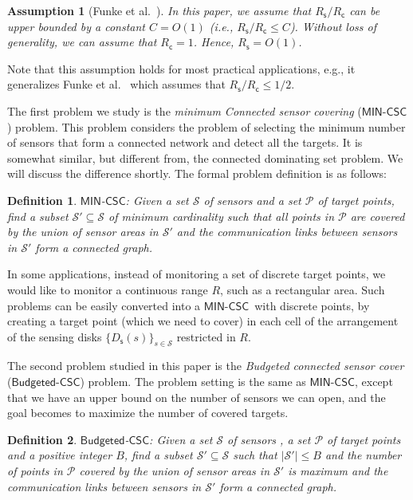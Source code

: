 \documentclass[11pt]{article}
\newcommand{\calP}{{\mathcal P}}
\newcommand{\calS}{{\mathcal S}}
\newtheorem{assumption}{Assumption}
\newcommand{\mincsc}{$\mathsf{MIN}$-$\mathsf{CSC}$}
\newcommand{\bcsc}{$\mathsf{Budgeted}$-$\mathsf{CSC}$}
\newcommand{\Rc}{R_\mathsf{c}}
\newcommand{\Rs}{R_\mathsf{s}}
\newcommand{\Ds}{D_\mathsf{s}}
\newtheorem{definition}{Definition}
\begin{document}
\begin{assumption}[Funke et al.~\cite{funke2007improved}]
	\label{ass:1}
	In this paper, we assume that $\Rs/\Rc$ can be upper bounded by a constant $C=O(1)$
	(i.e., $\Rs/\Rc\leq C$). 
Without loss of generality, we can assume that $\Rc=1$.
	Hence, $\Rs= O(1)$.
\end{assumption}

Note that this assumption holds for most practical
applications, e.g., it generalizes Funke et al.~\cite{funke2007improved} which assumes that $\Rs/\Rc\leq 1/2$.

The first problem we study is the {\em minimum Connected sensor covering} (\mincsc) problem.
This problem considers the problem of selecting the minimum number of sensors
that form a connected network and detect all the targets.
It is somewhat similar, but different from, the connected dominating set problem.
We will discuss the difference shortly.
The formal problem definition is as follows:

\begin{definition}
	\mincsc: Given a set $\calS$ of sensors
	and a set $\calP$ of target points,
	find a subset $\calS'\subseteq \calS$ of minimum cardinality
	such that all points in $\calP$ are covered by the union of sensor areas in $\calS'$
	and the communication links between sensors in $\calS'$ form a connected graph.
\end{definition}
\vspace{-0.1cm}

In some applications, instead of monitoring a set of discrete target points,
we would like to monitor a continuous range $R$, such as a rectangular area.
Such problems can be easily converted into a \mincsc\ with discrete points,
by creating a target point (which we need to cover) in each cell of the arrangement
of the sensing disks $\{\Ds(s)\}_{s\in \calS}$ restricted in $R$.


The second problem
studied in this paper is the {\em Budgeted connected sensor cover}  (\bcsc) problem.
The problem setting is the same as \mincsc, except that
we have an upper bound on the number of sensors we can open, and the goal becomes
to maximize the number of covered targets.

\vspace{-0.1cm}
\begin{definition}
	\bcsc: Given a set $\calS$ of sensors , a set $\calP$ of target points and a positive integer $B$,
	find a subset $\calS'\subseteq \calS$
	such that $|\calS'| \leq B$ and the number of points in $\calP$ covered by the union of sensor areas in $\calS'$ is maximum and the communication links between sensors in $\calS'$ form a connected graph.
\end{definition}
\end{document}
